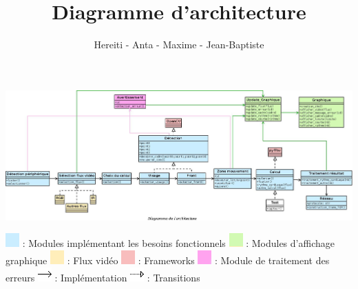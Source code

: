 \documentclass[12pt,a4paper]{article}
\title{Diagramme d'architecture}
\author{Hereiti \bsc{Hatitio} - Anta \bsc{Mbaye} - Maxime \bsc{Vincent} - Jean-Baptiste \bsc{Rey}}
\begin{document}
\maketitle

\newpage
\vspace*{-1.6in}
\vspace*{-\the\hoffset}
\thispagestyle{empty}
\includegraphics[scale=0.4,angle=90]{archi2.jpeg}
\begin{center}

\end{center}
\vspace*{-1in}
\vspace*{-\the\hoffset}
\includegraphics[scale=0.5]{bleu.png} : Modules implémentant les besoins fonctionnels\newline
\includegraphics[scale=0.5]{vert.png} : Modules d'affichage graphique\newline
\includegraphics[scale=0.5]{orange.png} : Flux vidéo\newline
\includegraphics[scale=0.5]{rouge.png} : Frameworks\newline
\includegraphics[scale=0.5]{rose.png} :  Module de traitement des erreurs\newline
\includegraphics[scale=0.5]{fleche.png} :  Implémentation\newline
\includegraphics[scale=0.5]{fleche_pointille.png} :  Transitions\newline
\end{document}

